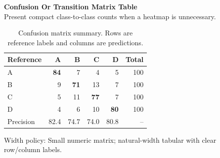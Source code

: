 \documentclass[10pt]{article}
\begin{document}
{\large\textbf{Confusion Or Transition Matrix Table}}\\[-0.05em]
{\footnotesize\textcolor{GroupText}{Present compact class-to-class counts when a heatmap is unnecessary.}}\\[0.35em]
\begin{table}[H]
\centering
\caption{Confusion matrix summary. Rows are reference labels and columns are predictions.}
\label{tab:confusion-matrix}
\small
\begin{tabular}{@{}lrrrrr@{}}
\toprule
\rowcolor{HeaderTint}
\textbf{Reference} & \textbf{A} & \textbf{B} & \textbf{C} & \textbf{D} & \textbf{Total} \\
\midrule
A & \textbf{84} & 7 & 4 & 5 & 100 \\
B & 9 & \textbf{71} & 13 & 7 & 100 \\
C & 5 & 11 & \textbf{77} & 7 & 100 \\
D & 4 & 6 & 10 & \textbf{80} & 100 \\
\midrule
Precision & 82.4 & 74.7 & 74.0 & 80.8 & -- \\
\bottomrule
\end{tabular}
\end{table}
\vfill
{\footnotesize\textcolor{GroupText}{Width policy: Small numeric matrix; natural-width tabular with clear row/column labels.}}
\end{document}

